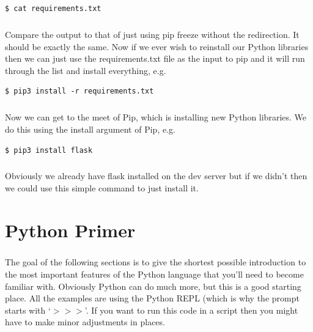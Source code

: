 \documentclass[12pt, a4paper, oneside]{book}
\begin{document}
{\begin{lstlisting}[style=DOS]
    $ cat requirements.txt
\end{lstlisting}

\paragraph{} Compare the output to that of just using pip freeze without the redirection. It should be exactly the same. Now if we ever wish to reinstall our Python libraries then we can just use the requirements.txt file as the input to pip and it will run through the list and install everything, e.g.

\begin{lstlisting}[style=DOS]
    $ pip3 install -r requirements.txt
\end{lstlisting}

\paragraph{} Now we can get to the meet of Pip, which is installing new Python libraries. We do this using the install argument of Pip, e.g.

\begin{lstlisting}[style=DOS]
    $ pip3 install flask
\end{lstlisting}

\paragraph{} Obviously we already have flask installed on the dev server but if we didn't then we could use this simple command to just install it. 


\chapter{Python Primer}
\label{python-primer}

\paragraph{} The goal of the following sections is to give the shortest possible introduction to the most important features of the Python language that you'll need to become familiar with. Obviously Python can do much more, but this is a good starting place. All the examples are using the Python REPL (which is why the prompt starts with `$>>>$'. If you want to run this code in a script then you might have to make minor adjustments in places.

}
\end{document}
